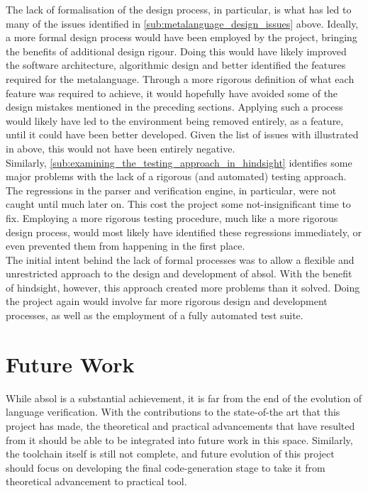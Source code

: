 The lack of formalisation of the design process, in particular, is what has led to many of the issues identified in \autoref{sub:metalanguage_design_issues} above.
Ideally, a more formal design process would have been employed by the project, bringing the benefits of additional design rigour.
Doing this would have likely improved the software architecture, algorithmic design and better identified the features required for the metalanguage. 
Through a more rigorous definition of what each feature was required to achieve, it would hopefully have avoided some of the design mistakes mentioned in the preceding sections. 
Applying such a process would likely have led to the environment being removed entirely, as a feature, until it could have been better developed.
Given the list of issues with illustrated in  above, this would not have been entirely negative. \\

Similarly, \autoref{sub:examining_the_testing_approach_in_hindsight} identifies some major problems with the lack of a rigorous (and automated) testing approach.
The regressions in the parser and verification engine, in particular, were not caught until much later on.
This cost the project some not-insignificant time to fix. 
Employing a more rigorous testing procedure, much like a more rigorous design process, would most likely have identified these regressions immediately, or even prevented them from happening in the first place.\\

The initial intent behind the lack of formal processes was to allow a flexible and unrestricted approach to the design and development of \gls{absol}.
With the benefit of hindsight, however, this approach created more problems than it solved.
Doing the project again would involve far more rigorous design and development processes, as well as the employment of a fully automated test suite.



\section{Future Work} %
\label{sec:future_work}

While \gls{absol} is a substantial achievement, it is far from the end of the evolution of language verification. 
With the contributions to the state-of-the art that this project has made, the theoretical and practical advancements that have resulted from it should be able to be integrated into future work in this space. 
Similarly, the toolchain itself is still not complete, and future evolution of this project should focus on developing the final code-generation stage to take it from theoretical advancement to practical tool.

